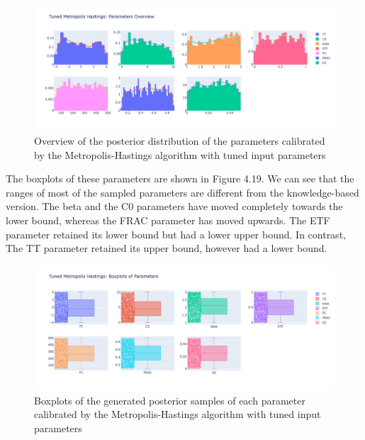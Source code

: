 \begin{figure}[H]
    \centering
    \includegraphics[width=1\textwidth]{figures/basic_mh/tuned_mh/tuned_mh_parameters_overview.png}
    \captionsetup{width=.8\textwidth}
    \caption{Overview of the posterior distribution of the parameters calibrated by the Metropolis-Hastings algorithm with tuned input parameters}
    \label{fig:enter-label}
\end{figure}


The boxplots of these parameters are shown in Figure 4.19. We can see that the ranges of most of the sampled parameters are different from the knowledge-based version. The beta and the C0 parameters have moved completely towards the lower bound, whereas the FRAC parameter has moved upwards. The ETF parameter retained its lower bound but had a lower upper bound. In contrast, The TT parameter retained its upper bound, however had a lower bound.


\begin{figure}[H]
    \centering
    \includegraphics[width=1\textwidth]{figures/basic_mh/tuned_mh/tuned_mh_boxplot.png}
    \captionsetup{width=.8\textwidth}
    \caption{Boxplots of the generated posterior samples of each parameter calibrated by the Metropolis-Hastings algorithm with tuned input parameters}
    \label{fig:enter-label}
\end{figure}


